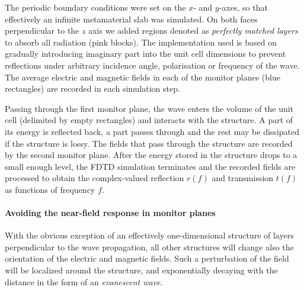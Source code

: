 The periodic boundary conditions were set on the $x$- and $y$-axes, so that effectively an infinite metamaterial slab was simulated. On both faces perpendicular to the $z$ axis we added regions denoted as \textit{perfectly matched layers} \cite{oskooi2011distinguishing} to absorb all radiation (pink blocks). The implementation used is based on gradually introducing imaginary part into the unit cell dimensions to prevent reflections under arbitrary incidence angle, polarisation or frequency of the wave.
The average electric and magnetic fields in each of the monitor planes (blue rectangles) are recorded  in each simulation step.  

Passing through the first monitor plane, the wave enters the volume of the unit cell (delimited by empty rectangles) and interacts with the structure. A part of its energy is reflected back, a part passes through and the rest may be dissipated if the structure is lossy. The fields that pass through the structure are recorded by the second monitor plane. After the energy stored in the structure drops to a small enough level, the FDTD simulation terminates and the recorded fields are processed to obtain the complex-valued reflection $r(f)$ and transmission $t(f)$ as functions of frequency $f$. %

\paragraph{Avoiding the near-field response in monitor planes} %
\label{par_nearfield}
With the obvious exception of an effectively one-dimensional structure of layers perpendicular to the wave propagation, all other structures will change also the orientation of the electric and magnetic fields. Such a perturbation of the field will be localized around the structure, and exponentially decaying with the distance in the form of an \textit{evanescent wave}.

